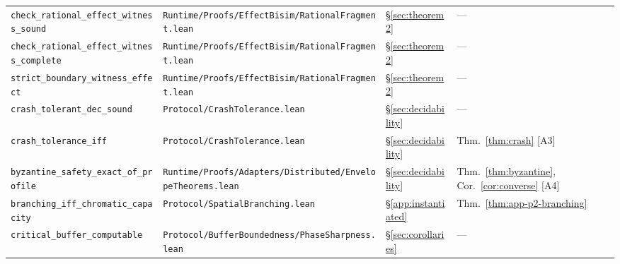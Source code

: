 \documentclass[a4paper,10pt,twocolumn,english]{article}
\numberwithin{equation}{section}
\theoremstyle{paperdef}
\theoremstyle{paperplain}
\theoremstyle{paperdef}
\theoremstyle{paperremark}
\begin{document}
\begin{table}[H]
\begin{tabularx}{\textwidth}{L{0.27\textwidth}L{0.37\textwidth}L{0.06\textwidth}>{\raggedright\arraybackslash}X}
		\texttt{check\_rational\_effect\_\allowbreak witness\_sound}    & \texttt{Runtime/\allowbreak Proofs/\allowbreak EffectBisim/\allowbreak}\mbox{\texttt{RationalFragment.lean}}                      & \S\ref{sec:theorem2}     & ---                                                                               \\
		\texttt{check\_rational\_effect\_\allowbreak witness\_complete} & \texttt{Runtime/\allowbreak Proofs/\allowbreak EffectBisim/\allowbreak}\mbox{\texttt{RationalFragment.lean}}                      & \S\ref{sec:theorem2}     & ---                                                                               \\
		\texttt{strict\_boundary\_\allowbreak witness\_effect}          & \texttt{Runtime/\allowbreak Proofs/\allowbreak EffectBisim/\allowbreak}\mbox{\texttt{RationalFragment.lean}}                      & \S\ref{sec:theorem2}     & ---                                                                               \\
		\texttt{crash\_tolerant\_\allowbreak dec\_sound}                & \texttt{Protocol/\allowbreak}\mbox{\texttt{CrashTolerance.lean}}                                                                  & \S\ref{sec:decidability} & ---                                                                               \\
		\texttt{crash\_tolerance\_iff}                                  & \texttt{Protocol/\allowbreak}\mbox{\texttt{CrashTolerance.lean}}                                                                  & \S\ref{sec:decidability} & Thm.~\ref{thm:crash} [A3]                                                         \\
		\texttt{byzantine\_safety\_\allowbreak exact\_of\_profile}      & \texttt{Runtime/\allowbreak Proofs/\allowbreak Adapters/\allowbreak Distributed/\allowbreak}\mbox{\texttt{EnvelopeTheorems.lean}} & \S\ref{sec:decidability} & Thm.~\ref{thm:byzantine}, Cor.~\ref{cor:converse} [A4]                            \\
		\texttt{branching\_iff\_\allowbreak chromatic\_capacity}        & \texttt{Protocol/\allowbreak}\mbox{\texttt{SpatialBranching.lean}}                                                                & \S\ref{app:instantiated} & Thm.~\ref{thm:app-p2-branching}                                                   \\
		\texttt{critical\_buffer\_\allowbreak computable}               & \texttt{Protocol/\allowbreak BufferBoundedness/\allowbreak}\mbox{\texttt{PhaseSharpness.lean}}                                    & \S\ref{sec:corollaries}  & ---                                                                               \\

\end{tabularx}
\end{table}
\end{document}

